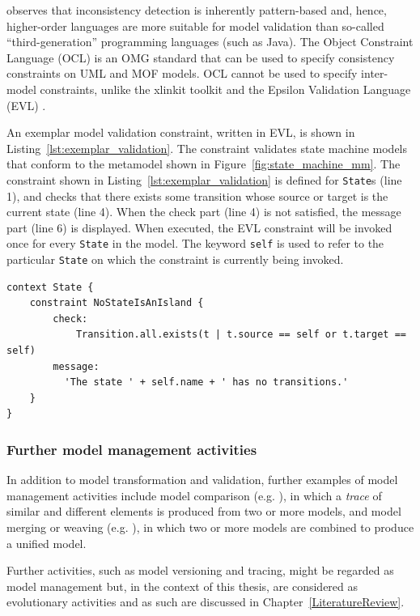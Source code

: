 \cite{kolovos09thesis} observes that inconsistency detection is inherently pattern-based and, hence, higher-order languages are more suitable for model validation than so-called ``third-generation'' programming languages (such as Java). The Object Constraint Language (OCL) \cite{ocl2} is an OMG standard that can be used to specify consistency constraints on UML and MOF models. OCL cannot be used to specify inter-model constraints, unlike the xlinkit toolkit \cite{nentwich2003flexible} and the Epsilon Validation Language (EVL) \cite{kolovos08evl}.

An exemplar model validation constraint, written in EVL, is shown in Listing~\ref{lst:exemplar_validation}. The constraint validates state machine models that conform to the metamodel shown in Figure~\ref{fig:state_machine_mm}. The constraint shown in Listing~\ref{lst:exemplar_validation} is defined for \texttt{State}s (line 1), and checks that there exists some transition whose source or target is the current state (line 4). When the check part (line 4) is not satisfied, the message part (line 6) is displayed. When executed, the EVL constraint will be invoked once for every \texttt{State} in the model. The keyword \texttt{self} is used to refer to the particular \texttt{State} on which the constraint is currently being invoked.

\begin{lstlisting}[caption=Exemplar model validation in the Epsilon Validation Language, label=lst:exemplar_validation, language=EVL]
context State {
	constraint NoStateIsAnIsland {
		check:
			Transition.all.exists(t | t.source == self or t.target == self)
		message:
		  'The state ' + self.name + ' has no transitions.'
	}
}
\end{lstlisting}

\subsubsection{Further model management activities}
In addition to model transformation and validation, further examples of model management activities include model comparison (e.g. \cite{kolovos06ecl}), in which a \emph{trace} of similar and different elements is produced from two or more models, and model merging or weaving (e.g. \cite{kolovos07eml}), in which two or more models are combined to produce a unified model.

Further activities, such as model versioning and tracing, might be regarded as model management but, in the context of this thesis, are considered as evolutionary activities and as such are discussed in Chapter~\ref{LiteratureReview}.

